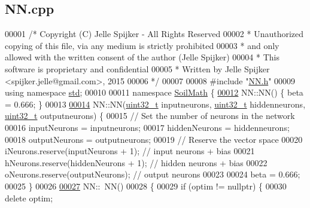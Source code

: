 \hypertarget{_n_n_8cpp_source}{}\subsection{N\+N.\+cpp}
\label{_n_n_8cpp_source}

\begin{DoxyCode}
00001 \textcolor{comment}{/* Copyright (C) Jelle Spijker - All Rights Reserved}
00002 \textcolor{comment}{ * Unauthorized copying of this file, via any medium is strictly prohibited}
00003 \textcolor{comment}{ * and only allowed with the written consent of the author (Jelle Spijker)}
00004 \textcolor{comment}{ * This software is proprietary and confidential}
00005 \textcolor{comment}{ * Written by Jelle Spijker <spijker.jelle@gmail.com>, 2015}
00006 \textcolor{comment}{ */}
00007 
00008 \textcolor{preprocessor}{#include "\hyperlink{_n_n_8h}{NN.h}"}
00009 \textcolor{keyword}{using namespace }\hyperlink{namespacestd}{std};
00010 
00011 \textcolor{keyword}{namespace }\hyperlink{namespace_soil_math}{SoilMath} \{
\hypertarget{_n_n_8cpp_source_l00012}{}\hyperlink{class_soil_math_1_1_n_n_a778606ea8a193479da233a030d1df234}{00012} NN::NN() \{ beta = 0.666; \}
00013 
\hypertarget{_n_n_8cpp_source_l00014}{}\hyperlink{class_soil_math_1_1_n_n_a46efd1eb7e31be2818c9858b640fcb5b}{00014} NN::NN(\hyperlink{_soil_math_types_8h_a435d1572bf3f880d55459d9805097f62}{uint32\_t} inputneurons, \hyperlink{_soil_math_types_8h_a435d1572bf3f880d55459d9805097f62}{uint32\_t} hiddenneurons, \hyperlink{_soil_math_types_8h_a435d1572bf3f880d55459d9805097f62}{uint32\_t} outputneurons) \{
00015   \textcolor{comment}{// Set the number of neurons in the network}
00016   inputNeurons = inputneurons;
00017   hiddenNeurons = hiddenneurons;
00018   outputNeurons = outputneurons;
00019   \textcolor{comment}{// Reserve the vector space}
00020   iNeurons.reserve(inputNeurons + 1);  \textcolor{comment}{// input neurons + bias}
00021   hNeurons.reserve(hiddenNeurons + 1); \textcolor{comment}{// hidden neurons + bias}
00022   oNeurons.reserve(outputNeurons);     \textcolor{comment}{// output neurons}
00023 
00024   beta = 0.666;
00025 \}
00026 
\hypertarget{_n_n_8cpp_source_l00027}{}\hyperlink{class_soil_math_1_1_n_n_a37cb0ebe3576af3cf47c2e6330e1b34a}{00027} NN::~NN()
00028 \{
00029   \textcolor{keywordflow}{if} (optim != \textcolor{keyword}{nullptr}) \{
00030       \textcolor{keyword}{delete} optim;

\end{DoxyCode}
